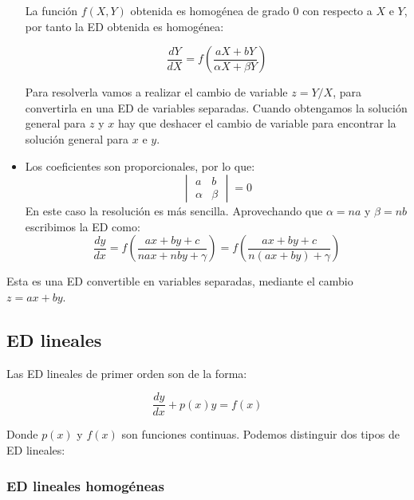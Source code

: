 \documentclass[a4paper,12pt,titlepage]{article}
\begin{document}
\begin{itemize}
    La función $f(X,Y)$ obtenida es homogénea de grado 0 con respecto a $X$ e $Y$, por tanto la ED obtenida es homogénea:

    \begin{equation*}
        \frac{dY}{dX} = f \left (\frac{aX+bY}{\alpha X + \beta Y}\right )
    \end{equation*}

    Para resolverla vamos a realizar el cambio de variable $z=Y/X$, para convertirla en una ED de variables separadas. Cuando obtengamos la solución general para $z$ y $x$ hay que deshacer el cambio de variable para encontrar la solución general para $x$ e $y$.

    \item Los coeficientes son proporcionales, por lo que:
    \begin{equation*}
        \begin{vmatrix}
            a & b \\
            \alpha & \beta
        \end{vmatrix} = 0
    \end{equation*}
    En este caso la resolución es más sencilla. Aprovechando que $\alpha = na$ y $\beta =nb$ escribimos la ED como:
    \begin{equation*}
        \frac{dy}{dx} = f\left (\frac{ax + by +c}{na x + nb y + \gamma}\right ) = f\left (\frac{ax + by +c}{n(a x + b y) + \gamma}\right )
    \end{equation*}
\end{itemize}

Esta es una ED convertible en variables separadas, mediante el cambio $z=ax+by$.

\newpage

\subsection{ED lineales}

Las ED lineales de primer orden son de la forma:

\begin{equation*}
    \frac{dy}{dx} + p(x)y = f(x)
\end{equation*}

Donde $p(x)$ y $f(x)$ son funciones continuas. Podemos distinguir dos tipos de ED lineales:

\subsubsection{ED lineales homogéneas}
\end{document}
